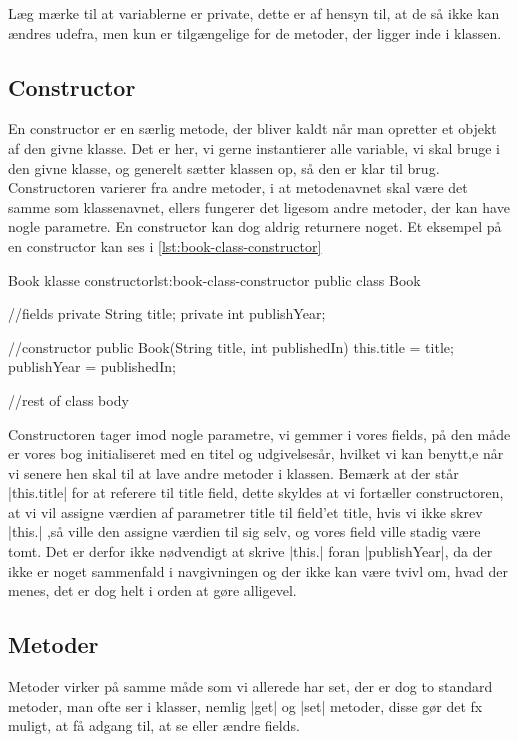 Læg mærke til at variablerne er private, dette er af hensyn til, at de så ikke kan ændres udefra, men kun er tilgængelige for de metoder, der ligger inde i klassen.

\subsection{Constructor}

En constructor er en særlig metode, der bliver kaldt når man opretter et objekt af den givne klasse. Det er her, vi gerne instantierer alle variable, vi skal bruge i den givne klasse, og generelt sætter klassen op, så den er klar til brug. Constructoren varierer fra andre metoder, i at metodenavnet skal være det samme som klassenavnet, ellers fungerer det ligesom andre metoder, der kan have nogle parametre. En constructor kan dog aldrig returnere noget. Et eksempel på en constructor kan ses i \autoref{lst:book-class-constructor}

\begin{JavaCode}{Book klasse constructor}{lst:book-class-constructor}
	public class Book {
		//fields
		private String title;
		private int publishYear;
		
		//constructor
		public Book(String title, int publishedIn) {
			this.title = title;
			publishYear = publishedIn;
		}
		
		//rest of class body
	}
\end{JavaCode}

Constructoren tager imod nogle parametre, vi gemmer i vores fields, på den måde er vores bog initialiseret med en titel og udgivelsesår, hvilket vi kan benytt,e når vi senere hen skal til at lave andre metoder i klassen. Bemærk at der står \JavaInline|this.title| for at referere til title field, dette skyldes at vi fortæller constructoren, at vi vil assigne værdien af parametrer title til field'et title, hvis vi ikke skrev \JavaInline|this.| ,så ville den assigne værdien til sig selv, og vores field ville stadig være tomt. Det er derfor ikke nødvendigt at skrive \JavaInline|this.| foran \JavaInline|publishYear|, da der ikke er noget sammenfald i navgivningen og der ikke kan være tvivl om, hvad der menes, det er dog helt i orden at gøre alligevel.

\subsection{Metoder}

Metoder virker på samme måde som vi allerede har set, der er dog to standard metoder, man ofte ser i klasser, nemlig \JavaInline|get| og \JavaInline|set| metoder, disse gør det fx muligt, at få adgang til, at se eller ændre fields. 

